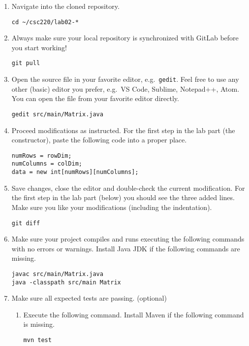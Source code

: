 \begin{enumerate}
\def\labelenumi{\arabic{enumi}.}
\item
  Navigate into the cloned repository.

\begin{verbatim}
cd ~/csc220/lab02-*
\end{verbatim}
\item
  Always make sure your local repository is synchronized with GitLab before you start working!

\begin{verbatim}
git pull
\end{verbatim}
\item
  Open the source file in your favorite editor, e.g.~\texttt{gedit}. Feel free to use any other (basic) editor you prefer, e.g.~VS Code, Sublime, Notepad++, Atom. You can open the file from your favorite editor directly.

\begin{verbatim}
gedit src/main/Matrix.java
\end{verbatim}
\item
  Proceed modifications as instructed. For the first step in the lab part (the constructor), paste the following code into a proper place.

\begin{verbatim}
numRows = rowDim;
numColumns = colDim;
data = new int[numRows][numColumns];
\end{verbatim}
\item
  Save changes, close the editor and double-check the current modification. For the first step in the lab part (below) you should see the three added lines. Make sure you like your modifications (including the indentation).

\begin{verbatim}
git diff
\end{verbatim}
\item
  Make sure your project compiles and runs executing the following commands with no errors or warnings. Install Java JDK if the following commands are missing.

\begin{verbatim}
javac src/main/Matrix.java
java -classpath src/main Matrix
\end{verbatim}
\item
  Make sure all expected tests are passing. (optional)

  \begin{enumerate}
  \def\labelenumii{\arabic{enumii}.}
  \item
    Execute the following command. Install Maven if the following command is missing.
\begin{verbatim}
mvn test
\end{verbatim}


\end{enumerate}
\end{enumerate}
